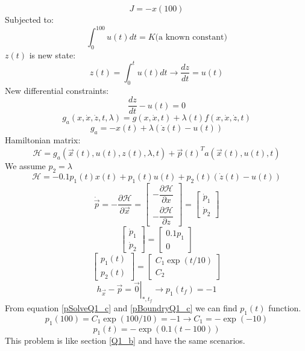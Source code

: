 $$J = -x(100)$$
Subjected to:
$$\int_0^{100}u(t)dt = K\text{(a known constant)}$$
$z(t)$ is new state:
$$z(t) = \int_0^{t}u(t)dt \to \dfrac{dz}{dt} =u(t) $$
New differential constraints:
$$\dfrac{dz}{dt} - u(t) = 0$$
$$g_a(x, \dot x, \dot z, t, \lambda) = g(x, \dot x, t) + \lambda(t)f(x, \dot x, \dot z, t) $$
$$g_a = -x(t) + \lambda (\dot z (t)- u(t))$$
Hamiltonian matrix:
$$\mathcal{H} =  g_a(\vec x(t), u(t), z(t), \lambda,  t) + {\vec{p}(t)}^Ta(\vec x(t), u(t), t)$$
We assume $p_2 = \lambda$
\begin{equation}\label{HamiltonianQ1_c}
	\mathcal{H} = -0.1p_1(t)x(t)+p_1(t)u(t) + p_2(t)(\dot z(t)- u(t))
\end{equation}
$$\dot{\vec{p}} = -\dfrac{\partial \mathcal{H} }{\partial \vec x} =  \begin{bmatrix}
	-\dfrac{\partial \mathcal{H} }{\partial x} \\[10pt]
	-\dfrac{\partial \mathcal{H} }{\partial z} 
\end{bmatrix} = 
\begin{bmatrix}
	\dot p_1 \\
	\dot p_2
\end{bmatrix}
$$
$$
\begin{bmatrix}
	\dot p_1 \\
	\dot p_2
\end{bmatrix} = \begin{bmatrix}
	0.1p_1\\
	0
\end{bmatrix}
$$
\begin{equation}\label{pSolveQ1_c}
	\begin{bmatrix}
		p_1(t)\\
		p_2(t)
	\end{bmatrix} = 
	\begin{bmatrix}
		C_1\exp(t/10)\\
		C_2
	\end{bmatrix}
\end{equation}
\begin{equation}\label{pBoundryQ1_c}
 \left .h_{\vec x} - \vec{p} = \vec{0} \right \vert_{*, t_f} \to p_1(t_f) = -1
\end{equation}
From equation \ref{pSolveQ1_c} and \ref{pBoundryQ1_c} we can find $p_1(t)$ function.
$$
p_1(100) = C_1\exp(100/10) = -1 \to C_1 = -\exp(-10)
$$
$$
p_1(t) = -\exp(0.1(t-100))$$
This problem is like section \ref{Q1_b} and have the same scenarios.